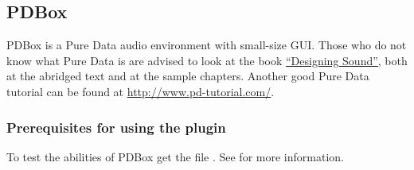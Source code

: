 \subsection{PDBox}

PDBox is a Pure Data audio environment with small-size GUI. Those who do not know
what Pure Data is are advised to look at the book \href{http://aspress.co.uk/ds/}
{``Designing Sound''}, both at the abridged text and at the sample chapters.
Another good Pure Data tutorial can be found at \url{http://www.pd-tutorial.com/}.

\subsubsection{Prerequisites for using the plugin}
To test the abilities of PDBox get the file
\href{http://www.rockbox.org/wiki/pub/Main/PureDataOnRockbox/PureData.zip}
{}. See  for more information.
